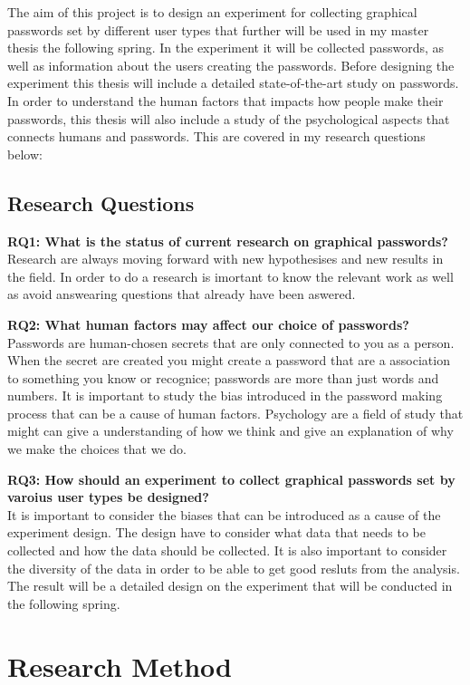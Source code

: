 The aim of this project is to design an experiment for collecting graphical passwords set by different user types that further will be used in my master thesis the following spring. In the experiment it will be collected passwords, as well as information about the users creating the passwords. Before designing the experiment this thesis will include a detailed state-of-the-art study on passwords. In order to understand the human factors that impacts how people make their passwords, this thesis will also include a study of the psychological aspects that connects humans and passwords. This are covered in my research questions below:

  \subsection*{Research Questions}

    {\bf RQ1: What is the status of current research on graphical passwords? } \\
    Research are always moving forward with new hypothesises and new results in the field. In order to do a research is imortant to know the relevant work as well as avoid answearing questions that already have been aswered.
    
    {\bf RQ2: What human factors may affect our choice of passwords?} \\
    Passwords are human-chosen secrets that are only connected to you as a person. When the secret are created you might create a password that are a association to something you know or recognice; passwords are more than just words and numbers. It is important to study the bias introduced in the password making process that can be a cause of human factors. Psychology are a field of study that might can give a understanding of how we think and give an explanation of why we make the choices that we do. 
    
    {\bf RQ3: How should an experiment to collect graphical passwords set by varoius user types be designed?} \\
    It is important to consider the biases that can be introduced as a cause of the experiment design. The design have to consider what data that needs to be collected and how the data should be collected. It is also important to consider the diversity of the data in order to be able to get good resluts from the analysis. The result will be a detailed design on the experiment that will be conducted in the following spring. 

\section{Research Method}


